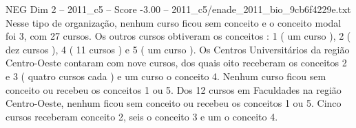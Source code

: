 \begin{textsample}{NEG Dim 2 – 2011\_c5 – Score -3.00 – 2011\_c5/enade\_2011\_bio\_9cb6f4229e.txt}
Nesse tipo de organização, nenhum curso ficou sem conceito e o conceito modal foi 3, com 27 cursos.
Os outros cursos obtiveram os conceitos : 1 ( um curso ), 2 ( dez cursos ), 4 ( 11 cursos ) e 5 ( um curso ).
Os Centros Universitários da região Centro-Oeste contaram com nove cursos, dos quais oito receberam os conceitos 2 e 3 ( quatro cursos cada ) e um curso o conceito 4.
Nenhum curso ficou sem conceito ou recebeu os conceitos 1 ou 5.
Dos 12 cursos em Faculdades na região Centro-Oeste, nenhum ficou sem conceito ou recebeu os conceitos 1 ou 5.
Cinco cursos receberam conceito 2, seis o conceito 3 e um o conceito 4.

\end{textsample}
